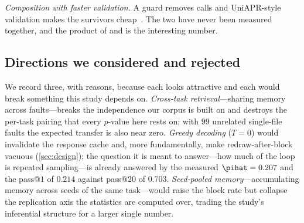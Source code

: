 \emph{Composition with faster validation.} A guard removes calls and
UniAPR-style validation makes the survivors cheap~\cite{chen2021uniapr,%
xiao2024expressapr}. The two have never been measured together, and the
product of  and  is the interesting number.

\subsection{Directions we considered and rejected}
We record three, with reasons, because each looks attractive and each would
break something this study depends on.
\emph{Cross-task retrieval}---sharing memory across faults---breaks the
independence our corpus is built on and destroys the per-task pairing that
every $p$-value here rests on; with $99$ unrelated single-file faults the
expected transfer is also near zero.
\emph{Greedy decoding} ($T = 0$) would invalidate the response cache and, more
fundamentally, make redraw-after-block vacuous (\cref{sec:design}); the
question it is meant to answer---how much of the loop is repeated
sampling---is already answered by the measured $\pihat = 0.207$ and the
pass@$1$ of $0.214$ against pass@$20$ of $0.703$.
\emph{Seed-pooled memory}---accumulating memory across seeds of the same
task---would raise the block rate but collapse the replication axis the
statistics are computed over, trading the study's inferential structure for a
larger single number.
